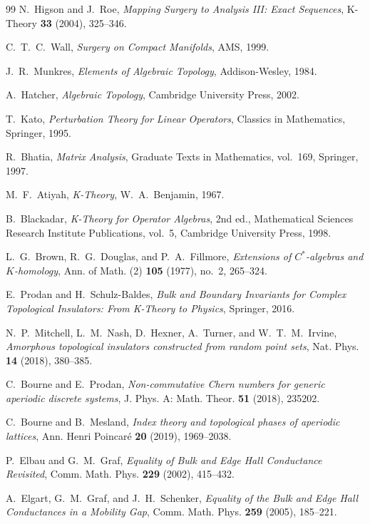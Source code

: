 \documentclass[11pt]{article}
\numberwithin{equation}{section}
\theoremstyle{definition}
\theoremstyle{remark}
\begin{document}
\begin{thebibliography}{99}
N.~Higson and J.~Roe,
\emph{Mapping Surgery to Analysis III: Exact Sequences},
K-Theory \textbf{33} (2004), 325--346.

C.~T.~C.~Wall,
\emph{Surgery on Compact Manifolds},
AMS, 1999.

J.~R.~Munkres,
\emph{Elements of Algebraic Topology},
Addison-Wesley, 1984.

A.~Hatcher,
\emph{Algebraic Topology},
Cambridge University Press, 2002.

T.~Kato,
\emph{Perturbation Theory for Linear Operators},
Classics in Mathematics, Springer, 1995.

R.~Bhatia,
\emph{Matrix Analysis},
Graduate Texts in Mathematics, vol.~169, Springer, 1997.

M.~F.~Atiyah,
\emph{K-Theory},
W.~A.~Benjamin, 1967.

B.~Blackadar,
\emph{K-Theory for Operator Algebras},
2nd ed., Mathematical Sciences Research Institute Publications, vol.~5,
Cambridge University Press, 1998.

L.~G.~Brown, R.~G.~Douglas, and P.~A.~Fillmore,
\emph{Extensions of $C^*$-algebras and $K$-homology},
Ann. of Math. (2) \textbf{105} (1977), no.~2, 265--324.

E.~Prodan and H.~Schulz-Baldes,
\emph{Bulk and Boundary Invariants for Complex Topological Insulators: From K-Theory to Physics},
Springer, 2016.

N.~P.~Mitchell, L.~M.~Nash, D.~Hexner, A.~Turner, and W.~T.~M.~Irvine,
\emph{Amorphous topological insulators constructed from random point sets},
Nat. Phys. \textbf{14} (2018), 380--385.

C.~Bourne and E.~Prodan,
\emph{Non-commutative Chern numbers for generic aperiodic discrete systems},
J. Phys. A: Math. Theor. \textbf{51} (2018), 235202.

C.~Bourne and B.~Mesland,
\emph{Index theory and topological phases of aperiodic lattices},
Ann. Henri Poincar\'e \textbf{20} (2019), 1969--2038.

P.~Elbau and G.~M.~Graf,
\emph{Equality of Bulk and Edge Hall Conductance Revisited},
Comm. Math. Phys. \textbf{229} (2002), 415--432.

A.~Elgart, G.~M.~Graf, and J.~H.~Schenker,
\emph{Equality of the Bulk and Edge Hall Conductances in a Mobility Gap},
Comm. Math. Phys. \textbf{259} (2005), 185--221.


\end{thebibliography}
\end{document}
